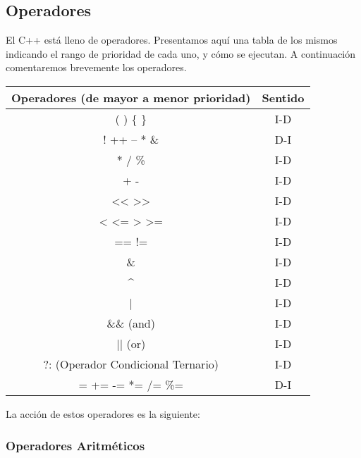 \subsection{Operadores}

El C++ está lleno de operadores. Presentamos aquí una tabla de los mismos indicando el rango de prioridad de cada uno, y cómo se ejecutan. A continuación comentaremos brevemente los operadores.

\begin{center}
	\begin{tabular}{|c|c|}
		\hline
		\textbf{Operadores (de mayor a menor prioridad)} & \textbf{Sentido} \\
		\hline
		( ) \{ \} & I-D \\
		\hline
		! ++ --  * \& & D-I \\
		\hline
		* / \% & I-D \\
		\hline
		+ - & I-D \\
		\hline
		<< >> & I-D \\
		\hline
		< <= > >= & I-D \\
		\hline
		== != & I-D \\
		\hline
		\& & I-D \\
		\hline
		\textasciicircum & I-D \\
		\hline
		| & I-D \\
		\hline
		\&\& (and) & I-D \\
		\hline
		|| (or) & I-D \\
		\hline
		?: (Operador Condicional Ternario) & I-D \\
		\hline
		= += -= *= /= \%= & D-I \\
		\hline
	\end{tabular}
\end{center}

La acción de estos operadores es la siguiente:

\subsubsection{Operadores Aritméticos}

